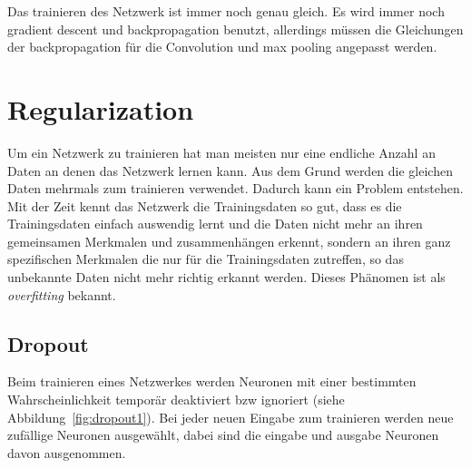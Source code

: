 \documentclass[12pt,a4paper]{report}
\begin{document}
Das trainieren des Netzwerk ist immer noch genau gleich.
Es wird immer noch gradient descent und backpropagation benutzt,
allerdings müssen die Gleichungen der backpropagation für die Convolution und max pooling angepasst werden.

\section{Regularization}
Um ein Netzwerk zu trainieren hat man meisten nur eine endliche Anzahl an Daten an denen das Netzwerk lernen kann.
Aus dem Grund werden die gleichen Daten mehrmals zum trainieren verwendet.
Dadurch kann ein Problem entstehen.
Mit der Zeit kennt das Netzwerk die Trainingsdaten so gut, dass es die Trainingsdaten einfach auswendig lernt
und die Daten nicht mehr an ihren gemeinsamen Merkmalen und zusammenhängen erkennt,
sondern an ihren ganz spezifischen Merkmalen die nur für die Trainingsdaten zutreffen,
so das unbekannte Daten nicht mehr richtig erkannt werden.
Dieses Phänomen ist als \textit{overfitting} bekannt.
\subsection{Dropout}
Beim trainieren eines Netzwerkes werden Neuronen mit einer bestimmten Wahrscheinlichkeit temporär deaktiviert bzw ignoriert (siehe Abbildung~\ref{fig:dropout1}).
Bei jeder neuen Eingabe zum trainieren werden neue zufällige Neuronen ausgewählt,
dabei sind die eingabe und ausgabe Neuronen davon ausgenommen.
\end{document}
